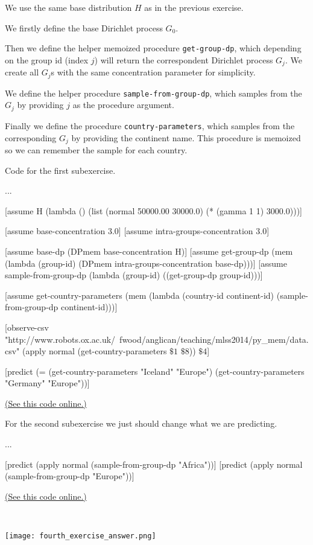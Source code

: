 \documentclass[11pt,reqno]{amsart}
\newcommand{\+}[1]{\ensuremath{{\mathbf{#1}}}}
\begin{document}
We use the same base distribution $H$ as in the previous exercise.

We firstly define the base Dirichlet process $G_0$.

Then we define the helper memoized procedure \texttt{get-group-dp}, which depending on
the group id (index $j$) will return the correspondent Dirichlet process $G_j$.
We create all $G_j$s with the same concentration parameter for simplicity.

We define the helper procedure \texttt{sample-from-group-dp}, which
samples from the $G_j$ by providing $j$ as the procedure argument.

Finally we define the procedure \texttt{country-parameters},
which samples from the corresponding $G_j$ by providing the continent name. This procedure
is memoized so we can remember the sample for each country.

Code for the first subexercise.

\begin{code}{}{}
...

[assume H (lambda () (list (normal 50000.00 30000.0) (* (gamma 1 1) 3000.0)))]

[assume base-concentration 3.0]
[assume intra-groups-concentration 3.0]

[assume base-dp (DPmem base-concentration H)]
[assume get-group-dp
  (mem (lambda (group-id) (DPmem intra-groups-concentration base-dp)))]
[assume sample-from-group-dp
  (lambda (group-id) ((get-group-dp group-id)))]

[assume get-country-parameters
  (mem (lambda (country-id continent-id) (sample-from-group-dp continent-id)))]

[observe-csv
  "http://www.robots.ox.ac.uk/~fwood/anglican/teaching/mlss2014/py_mem/data.csv"
  (apply normal (get-country-parameters $\$1$ $\$8$)) $\$4$]

[predict (= (get-country-parameters "Iceland" "Europe")
            (get-country-parameters "Germany" "Europe"))]
\end{code}
\href{http://www.robots.ox.ac.uk/~fwood/anglican/teaching/mlss2014/py_mem/code/4_1.anglican}{(See this code online.)}

For the second subexercise we just should change what we are predicting.

\begin{code}{}{}
...

[predict (apply normal (sample-from-group-dp "Africa"))]
[predict (apply normal (sample-from-group-dp "Europe"))]
\end{code}
\href{http://www.robots.ox.ac.uk/~fwood/anglican/teaching/mlss2014/py_mem/code/4_2.anglican}{(See this code online.)}

\ 

\begin{center}
\texttt{[image: fourth\_exercise\_answer.png]}
\end{center}

\fi





\end{document}
